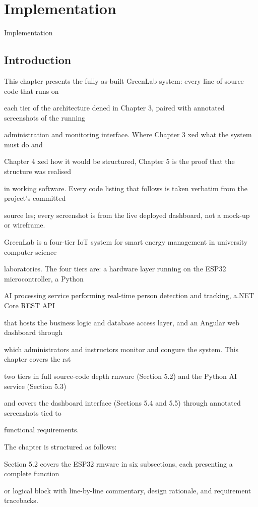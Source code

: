\chapter{Implementation}
Implementation


\section{Introduction}
This chapter presents the fully as-built GreenLab system: every line of source code that runs on

each tier of the architecture dened in Chapter 3, paired with annotated screenshots of the running

administration and monitoring interface. Where Chapter 3 xed what the system must do and

Chapter 4 xed how it would be structured, Chapter 5 is the proof that the structure was realised

in working software. Every code listing that follows is taken verbatim from the project's committed

source les; every screenshot is from the live deployed dashboard, not a mock-up or wireframe.

GreenLab is a four-tier IoT system for smart energy management in university computer-science

laboratories. The four tiers are: a hardware layer running on the ESP32 microcontroller, a Python

AI processing service performing real-time person detection and tracking, a.NET Core REST API

that hosts the business logic and database access layer, and an Angular web dashboard through

which administrators and instructors monitor and congure the system. This chapter covers the rst

two tiers in full source-code depth  rmware (Section 5.2) and the Python AI service (Section 5.3)

and covers the dashboard interface (Sections 5.4 and 5.5) through annotated screenshots tied to

functional requirements.

The chapter is structured as follows:

Section 5.2 covers the ESP32 rmware in six subsections, each presenting a complete function

or logical block with line-by-line commentary, design rationale, and requirement tracebacks.

